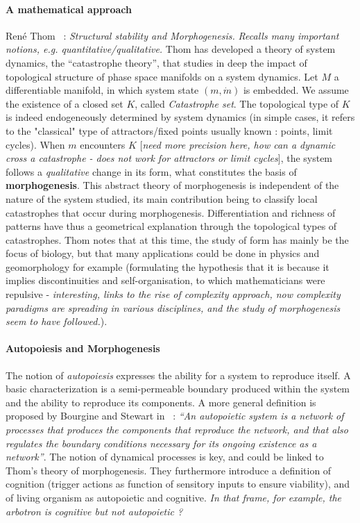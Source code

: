 \documentclass[fleqn,10pt]{wlscirep}
\begin{document}
\paragraph{A mathematical approach}

Ren{\'e} Thom~\cite{thom1974stabilite} : \textit{Structural stability and Morphogenesis.} \textit{Recalls many important notions, e.g. quantitative/qualitative.} Thom has developed a theory of system dynamics, the ``catastrophe theory'', that studies in deep the impact of topological structure of phase space manifolds on a system dynamics. Let $M$ a differentiable manifold, in which system state $(m,\dot{m})$ is embedded. We assume the existence of a closed set $K$, called \emph{Catastrophe set}. The topological type of $K$ is indeed endogeneously determined by system dynamics (in simple cases, it refers to the "classical" type of attractors/fixed points usually known : points, limit cycles). When $m$ encounters $K$ [\textit{need more precision here, how can a dynamic cross a catastrophe - does not work for attractors or limit cycles}], the system follows a \emph{qualitative} change in its form, what constitutes the basis of \textbf{morphogenesis}. This abstract theory of morphogenesis is independent of the nature of the system studied, its main contribution being to classify local catastrophes that occur during morphogenesis. Differentiation and richness of patterns have thus a geometrical explanation through the topological types of catastrophes. Thom notes that at this time, the study of form has mainly be the focus of biology, but that many applications could be done in physics and geomorphology for example (formulating the hypothesis that it is because it implies discontinuities and self-organisation, to which mathematicians were repulsive - \textit{interesting, links to the rise of complexity approach, now complexity paradigms are spreading in various disciplines, and the study of morphogenesis seem to have followed.}).


\paragraph{Autopoiesis and Morphogenesis}

The notion of \emph{autopoiesis} expresses the ability for a system to reproduce itself. A basic characterization is a semi-permeable boundary produced within the system and the ability to reproduce its components. A more general definition is proposed by Bourgine and Stewart in~\cite{bourgine2004autopoiesis} : \textit{``An autopoietic system is a network of processes that produces the components that reproduce the network, and that also regulates the boundary conditions necessary for its ongoing existence as a network''}. The notion of dynamical processes is key, and could be linked to Thom's theory of morphogenesis. They furthermore introduce a definition of cognition (trigger actions as function of sensitory inputs to ensure viability), and of living organism as autopoietic and cognitive. \textit{In that frame, for example, the arbotron is cognitive but not autopoietic ?}
\end{document}
